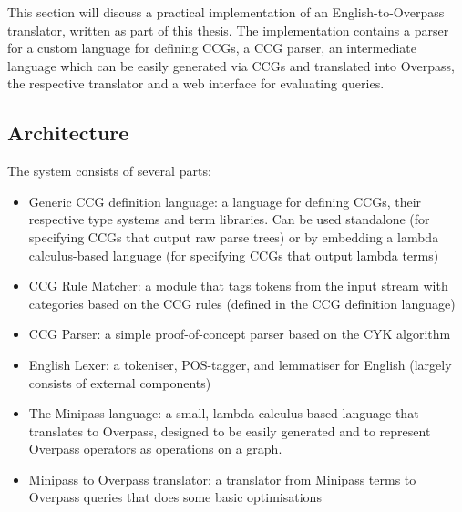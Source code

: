 \documentclass[main.tex]{subfiles}
\begin{document}

This section will discuss a practical implementation of an English-to-Overpass
translator, written as part of this thesis. The implementation contains a
parser for a custom language for defining CCGs, a CCG parser, an intermediate
language which can be easily generated via CCGs and translated into Overpass,
the respective translator and a web interface for evaluating queries.

\subsection{Architecture}
The system consists of several parts:


\begin{itemize}
    \item Generic CCG definition language: a language for defining CCGs,
          their respective type systems and term libraries. Can be used
          standalone (for specifying CCGs that output raw parse trees)
          or by embedding a lambda calculus-based language (for specifying
          CCGs that output lambda terms)

    \item CCG Rule Matcher: a module that tags tokens from the input stream
          with categories based on the CCG rules (defined in the CCG definition
          language)

    \item CCG Parser: a simple proof-of-concept parser based on the CYK
          algorithm

    \item English Lexer: a tokeniser, POS-tagger, and lemmatiser for English
          (largely consists of external components)

    \item The Minipass language: a small, lambda calculus-based language
          that translates to Overpass, designed to be easily generated and
          to represent Overpass operators as operations on a graph.

    \item Minipass to Overpass translator: a translator from Minipass terms
          to Overpass queries that does some basic optimisations
\end{itemize}
\end{document}
